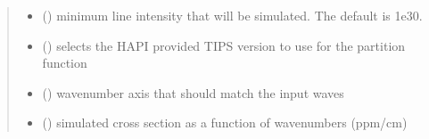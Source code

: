 \documentclass[letterpaper,10pt,english]{sphinxmanual}
\begin{document}
\begin{fulllineitems}
\begin{quote}
\begin{description}
\begin{itemize}
\item {} 
\sphinxAtStartPar
{} (\sphinxstyleliteralemphasis{\sphinxupquote{, }}) \textendash{} minimum line intensity that will be simulated. The default is 1e\sphinxhyphen{}30.

\item {} 
\sphinxAtStartPar
{} (\sphinxstyleliteralemphasis{\sphinxupquote{, }}) \textendash{} selects the HAPI provided TIPS version to use for the partition function

\end{itemize}

\sphinxAtStartPar
\begin{itemize}
\item {} 
\sphinxAtStartPar
{} () \textendash{} wavenumber axis that should match the input waves

\item {} 
\sphinxAtStartPar
{} () \textendash{} simulated cross section as a function of wavenumbers (ppm/cm)

\end{itemize}


\end{description}\end{quote}

\end{fulllineitems}

\label{\detokenize{MATS:module-MATS.generate_fitparam_file}}
\end{document}

